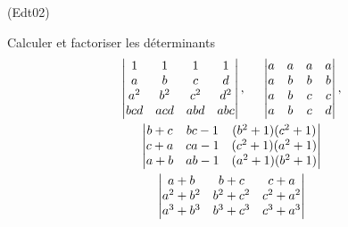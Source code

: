 \begin{tiny}(Edt02)\end{tiny}
Calculer et factoriser les d{\'e}terminants
\begin{multline*}
\begin{vmatrix}
1 & 1 & 1 & 1 \\
a & b & c & d \\
a^{2} & b^{2} & c^{2} & d^{2} \\
bcd & acd & abd & abc
\end{vmatrix},\hspace{0.5cm}
\begin{vmatrix}
a & a & a & a \\
a & b & b & b \\
a & b & c & c \\
a & b & c & d
\end{vmatrix}, \\
\begin{vmatrix}
b+c & bc-1 & (b^{2}+1)(c^{2}+1) \\
c+a & ca-1 & (c^{2}+1)(a^{2}+1) \\
a+b & ab-1 & (a^{2}+1)(b^{2}+1)
\end{vmatrix}\\
\begin{vmatrix}
a+b     & b+c     & c+a \\
a^2+b^2 & b^2+c^2 & c^2+a^2 \\
a^3+b^3 & b^3+c^3 & c^3+a^3
\end{vmatrix}
\end{multline*}

